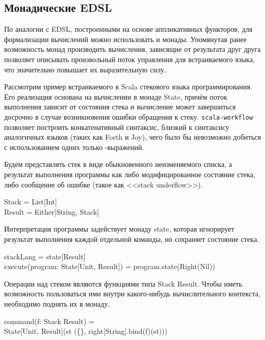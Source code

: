 \subsection{Монадические EDSL}
По аналогии с EDSL, построенными на основе аппликативных функторов, для формализации вычислений можно использовать и монады. Упомянутая ранее возможность монад производить вычисления, зависящие от результата друг друга позволяет описывать произвольный поток управления для встраиваемого языка, что значительно повышает их выразительную силу. 

Рассмотрим пример встраиваемого в Scala стекового языка программирования. Его реализация основана на вычислении в монаде \<State\>, причём поток выполнения зависит от состояния стека и вычисление может завершиться досрочно в случае возникновения ошибки обращения к стеку. \texttt{scala-workflow} позволяет построить конкатенативный синтаксис, близкий к синтаксису аналогичных языков (таких как Forth\cite{brodie2004thinking} и Joy\cite{von2001joy}), чего было бы невозможно добиться с использованием одних только \<\>-выражений.

Будем представлять стек в виде обыкновенного неизменяемого списка, а результат выполнения программы как либо модифицированное состояние стека, либо сообщение об ошибке (такое как <<stack underflow>>).

\begin{haskell}
 Stack = List[Int] \\
 Result = Either[String, Stack]
\end{haskell}

Интерпретация программы задействует монаду \<state\>, которая игнорирует результат выполнения каждой отдельной команды, но сохраняет состояние стека.

\begin{haskell}
 stackLang = state[Result] \\ 
 execute(program: State[Unit, Result]) = program.state(Right(Nil))
\end{haskell}

Операции над стеком являются функциями типа \<Stack \Rightarrow Result\>. Чтобы иметь возможность пользоваться ими внутри какого-нибудь вычислительного контекста, необходимо поднять их в монаду.

\begin{haskell}
 command(f: Stack \Rightarrow Result) = \\
\quad\quad State[Unit, Result](st \Rightarrow (\{\}, right[String].bind(f)(st)))
\end{haskell}

